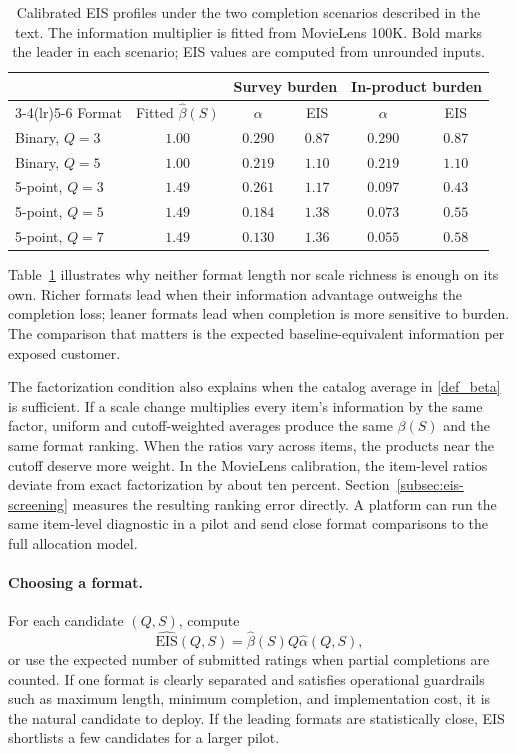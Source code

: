 \documentclass[11pt]{article}
\theoremstyle{definition}
\theoremstyle{remark}
\newcommand{\1}{\mathbf{1}}
\begin{document}
\begin{table}[H]
\centering
\scriptsize
\setlength{\tabcolsep}{5pt}
\begin{tabular}{lccccc}
\toprule
 & & \multicolumn{2}{c}{Survey burden} & \multicolumn{2}{c}{In-product burden} \\
\cmidrule(lr){3-4}\cmidrule(lr){5-6}
Format & Fitted \(\hat\beta(S)\) & \(\alpha\) & EIS & \(\alpha\) & EIS \\
\midrule
Binary, $Q=3$  & $1.00$ & $0.290$ & $0.87$ & $0.290$ & $0.87$ \\
Binary, $Q=5$  & $1.00$ & $0.219$ & $1.10$ & $0.219$ & $\mathbf{1.10}$ \\
5-point, $Q=3$ & $1.49$ & $0.261$ & $1.17$ & $0.097$ & $0.43$ \\
5-point, $Q=5$ & $1.49$ & $0.184$ & $\mathbf{1.38}$ & $0.073$ & $0.55$ \\
5-point, $Q=7$ & $1.49$ & $0.130$ & $1.36$ & $0.055$ & $0.58$ \\
\bottomrule
\end{tabular}
\caption{Calibrated EIS profiles under the two completion scenarios described in the text. The information multiplier is fitted from MovieLens 100K. Bold marks the leader in each scenario; EIS values are computed from unrounded inputs.}
\label{tab:eis-calibrated}
\end{table}

Table~\ref{tab:eis-calibrated} illustrates why neither format length nor
scale richness is enough on its own. Richer formats lead when their
information advantage outweighs the completion loss; leaner formats lead
when completion is more sensitive to burden. The comparison that matters
is the expected baseline-equivalent information per exposed customer.

The factorization condition also explains when the catalog average in
\eqref{def_beta} is sufficient. If a scale change multiplies every
item's information by the same factor, uniform and cutoff-weighted
averages produce the same \(\beta(S)\) and the same format ranking. When
the ratios vary across items, the products near the cutoff deserve more
weight. In the MovieLens calibration, the item-level ratios deviate from exact
factorization by about ten percent. Section~\ref{subsec:eis-screening}
measures the resulting ranking error directly. A platform can run the
same item-level diagnostic in a pilot and send close format comparisons
to the full allocation model.

\paragraph{Choosing a format.} For each candidate \((Q,S)\), compute
\[
\widehat{\mathrm{EIS}}(Q,S)=\hat\beta(S)Q\hat\alpha(Q,S),
\]
or use the expected number of submitted ratings when partial completions
are counted. If one format is clearly separated and satisfies operational
guardrails such as maximum length, minimum completion, and implementation
cost, it is the natural candidate to deploy. If the leading formats are statistically close, EIS shortlists a few
candidates for a larger pilot.
\end{document}
